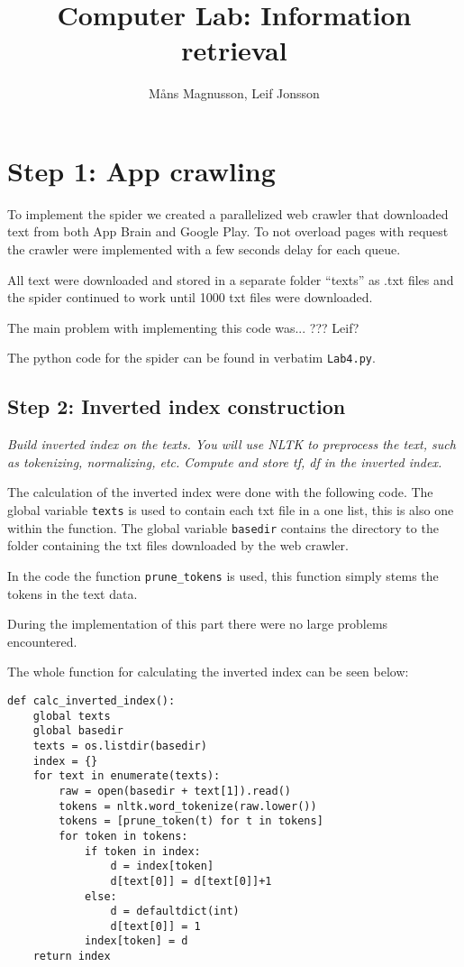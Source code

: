\documentclass[a4paper]{article}
\begin{document}
\title{Computer Lab: Information retrieval}
\author{Måns Magnusson, Leif Jonsson}

\section{Step 1: App crawling}
To implement the spider we created a parallelized web crawler that
downloaded text from both App Brain and Google Play. To not overload
pages with request the crawler were implemented with a few seconds
delay for each queue.

All text were downloaded and stored in a separate folder ``texts'' as
.txt files and the spider continued to work until 1000 txt files were downloaded.

The main problem with implementing this code was... ??? Leif?

The python code for the spider can be found in verbatim \texttt{Lab4.py}. 


\subsection{Step 2: Inverted index construction}
\textit{Build inverted index on the texts. You will use NLTK to preprocess the text, such as tokenizing, normalizing, etc. Compute and store tf, df in the inverted index.}

The calculation of the inverted index were done with the following
code. The global variable \texttt{texts} is used to contain each
txt file in a one list, this is also one within the function. The
global variable \texttt{basedir} contains the directory to the folder
containing the txt files downloaded by the web crawler.

In the code the function \texttt{prune_tokens} is used, this function
simply stems the tokens in the text data.

During the implementation of this part there were no large problems encountered.

The whole function for calculating the inverted index can be seen below:

\begin{verbatim}
def calc_inverted_index():
    global texts 
    global basedir
    texts = os.listdir(basedir)
    index = {}
    for text in enumerate(texts):
        raw = open(basedir + text[1]).read()
        tokens = nltk.word_tokenize(raw.lower())
        tokens = [prune_token(t) for t in tokens]
        for token in tokens:
            if token in index:
                d = index[token]
                d[text[0]] = d[text[0]]+1
            else:
                d = defaultdict(int)
                d[text[0]] = 1
            index[token] = d
    return index
\end{verbatim}
\end{document}
